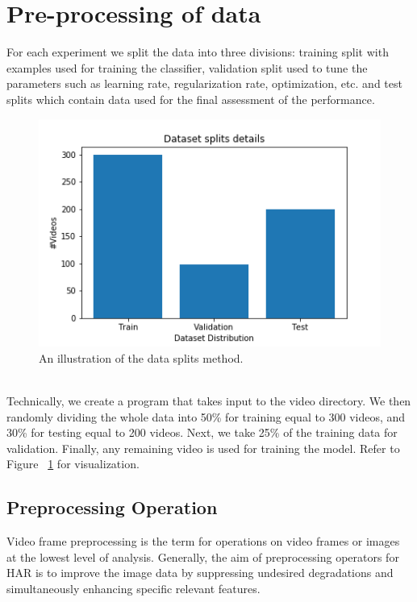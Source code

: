 \section{Pre-processing of data}
For each experiment we split the data into three divisions: training split with examples used for training the classifier, validation split used to tune the parameters such as learning rate, regularization rate, optimization, etc. and test splits which contain data used for the final assessment of the performance.\\

\begin{figure}[th]
\centering
\includegraphics[width=0.83\columnwidth]{Chapters/photos/ds.png}
\decoRule
\caption[An illustration of the data splits method.]{An illustration of the data splits method.}
\label{fig:trainvalidtest}
\end{figure}\\

Technically, we create a program that takes input to the video directory. We then randomly dividing the whole data into 50\% for training equal to 300 videos, and 30\% for testing equal to 200 videos. Next, we take 25\% of the training data for validation. Finally, any remaining video is used for training the model. Refer to Figure ~\ref{fig:trainvalidtest} for visualization.

\subsection{Preprocessing Operation}
Video frame preprocessing is the term for operations on video frames or images at the lowest level of analysis. Generally, the aim of preprocessing operators
for HAR is to improve the image data by suppressing undesired degradations and simultaneously enhancing specific relevant features.\\

